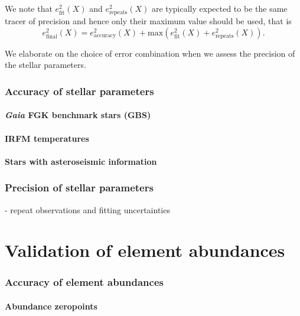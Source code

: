 \documentclass[fleqn,usenatbib,useAMS]{mnras}
\newcommand{\Gaia}{\textit{Gaia}\xspace}
\begin{document}
We note that $e_\text{fit}^2(X)$ and $e_\text{repeats}^2(X)$ are typically expected to be the same tracer of precision and hence only their maximum value should be used, that is
\begin{equation}
e_\text{final}^2 (X) = e_\text{accuracy}^2(X) + \text{max} \left(e_\text{fit}^2(X) + e_\text{repeats}^2(X) \right).
\end{equation}

We elaborate on the choice of error combination when we assess the precision of the stellar parameters.

\subsubsection{Accuracy of stellar parameters}

\paragraph*{\Gaia FGK benchmark stars (GBS)}

\paragraph*{IRFM temperatures}

\paragraph*{Stars with asteroseismic information}

\subsubsection{Precision of stellar parameters}

- repeat observations and fitting uncertainties

\section{Validation of element abundances} \label{sec:validation_ab}

\subsubsection{Accuracy of element abundances}

\paragraph*{Abundance zeropoints}
\end{document}
